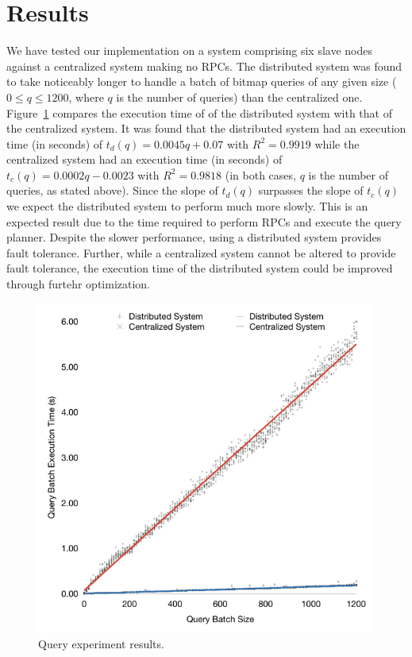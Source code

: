 \section{Results}
We have tested our implementation on a system comprising six slave nodes
against a centralized system making no RPCs. The distributed system was found
to take noticeably longer to handle a batch of bitmap queries of any given size
(\(0 \leq q \leq 1200\), where \(q\) is the number of queries) than the
centralized one. Figure~\ref{fig:graph-of-results} compares the execution time
of of the distributed system with that of the centralized system. It was found
that the distributed system had an execution time (in seconds) of
\(t_d(q) = 0.0045q + 0.07\) with \(R^2 = 0.9919\) while the centralized system
had an execution time (in seconds) of \(t_c(q) = 0.0002q - 0.0023\) with
\(R^2 = 0.9818\) (in both cases, \(q\) is the number of queries, as stated
above). Since the slope of \(t_d(q)\) surpasses the slope of \(t_c(q)\) we
expect the distributed system to perform much more slowly. This is an expected
result due to the time required to perform RPCs and execute the query planner.
Despite the slower performance, using a distributed system provides fault
tolerance. Further, while a centralized system cannot be altered to provide
fault tolerance, the execution time of the distributed system could be improved
through furtehr optimization.
%
\begin{figure}
    \centering
    \includegraphics[width=\columnwidth]{query-experiment-results}
    \caption{Query experiment results.}\label{fig:graph-of-results}
\end{figure}
